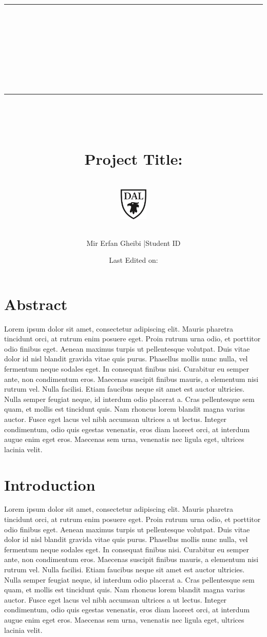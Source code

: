 \documentclass[11pt,titlepage]{article}
\title{\normalsize\rule{\textwidth}{0.1cm}\\ [0.5cm]
		\LARGE \textbf{\course}\\\reportname
		\\[0.5cm]\rule{\textwidth}{0.1cm}~\\[0.5cm]
		~
		\\\textbf{Project Title: }
		\\\prtitle
		\\ [0.5cm]
		\normalsize \vspace*{5\baselineskip}
		\includegraphics[width=0.1\textwidth]{graphics/institute_logo.png}\\[1cm]
		\author{Mir Erfan Gheibi |Student ID}
		\date{Last Edited on: \laseditdate}
		}
\begin{document}
\maketitle
\newpage

\section*{Abstract}
Lorem ipsum dolor sit amet, consectetur adipiscing elit. Mauris pharetra tincidunt orci, at rutrum enim posuere eget. Proin rutrum urna odio, et porttitor odio finibus eget. Aenean maximus turpis ut pellentesque volutpat. Duis vitae dolor id nisl blandit gravida vitae quis purus. Phasellus mollis nunc nulla, vel fermentum neque sodales eget. In consequat finibus nisi. Curabitur eu semper ante, non condimentum eros. Maecenas suscipit finibus mauris, a elementum nisi rutrum vel. Nulla facilisi. Etiam faucibus neque sit amet est auctor ultricies. Nulla semper feugiat neque, id interdum odio placerat a. Cras pellentesque sem quam, et mollis est tincidunt quis. Nam rhoncus lorem blandit magna varius auctor. Fusce eget lacus vel nibh accumsan ultrices a ut lectus. Integer condimentum, odio quis egestas venenatis, eros diam laoreet orci, at interdum augue enim eget eros. Maecenas sem urna, venenatis nec ligula eget, ultrices lacinia velit.

\section{Introduction}
Lorem ipsum dolor sit amet, consectetur adipiscing elit. Mauris pharetra tincidunt orci, at rutrum enim posuere eget. Proin rutrum urna odio, et porttitor odio finibus eget. Aenean maximus turpis ut pellentesque volutpat. Duis vitae dolor id nisl blandit gravida vitae quis purus. Phasellus mollis nunc nulla, vel fermentum neque sodales eget. In consequat finibus nisi. Curabitur eu semper ante, non condimentum eros. Maecenas suscipit finibus mauris, a elementum nisi rutrum vel. Nulla facilisi. Etiam faucibus neque sit amet est auctor ultricies. Nulla semper feugiat neque, id interdum odio placerat a. Cras pellentesque sem quam, et mollis est tincidunt quis. Nam rhoncus lorem blandit magna varius auctor. Fusce eget lacus vel nibh accumsan ultrices a ut lectus. Integer condimentum, odio quis egestas venenatis, eros diam laoreet orci, at interdum augue enim eget eros. Maecenas sem urna, venenatis nec ligula eget, ultrices lacinia velit.

 

\end{document}
